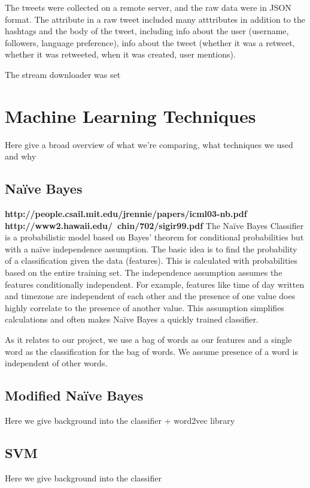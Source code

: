 \documentclass[11pt,letterpaper]{article}
\begin{document}
 The tweets were collected on a remote server, and the raw data were in JSON format. The attribute in a raw tweet included many atttributes in addition to the hashtags and the body of the tweet, including info about the user (username, followers, language preference), info about the tweet (whether it was a retweet, whether it was retweeted, when it was created, user mentions).
 
 The stream downloader was set 


\section{Machine Learning Techniques}
Here give a broad overview of what we're comparing, what techniques we used and why

\subsection{Na{\"i}ve Bayes}
\textbf{http://people.csail.mit.edu/jrennie/papers/icml03-nb.pdf} \textbf{http://www2.hawaii.edu/~chin/702/sigir99.pdf}
  The Na{\"i}ve Bayes Classifier is a probabilistic model based on Bayes' theorem for conditional probabilities but with a na{\"i}ve independence assumption. The basic idea is to find the probability of a classification given the data  (features). This is calculated with probabilities based on the entire training set. The independence assumption assumes the features conditionally independent. For example, features like time of day written and timezone are independent of each other and the presence of one value does highly correlate to the presence of another value. This assumption simplifies calculations and often makes Na{\"i}ve Bayes a quickly trained classifier.

As it relates to our project, we use a bag of words as our features and a single word as the classification for the bag of words. We assume presence of a word is independent of other words. 


\subsection{Modified Na{\"i}ve Bayes}
Here we give background into the classifier + word2vec library

\subsection{SVM}
Here we give background into the classifier
\end{document}
